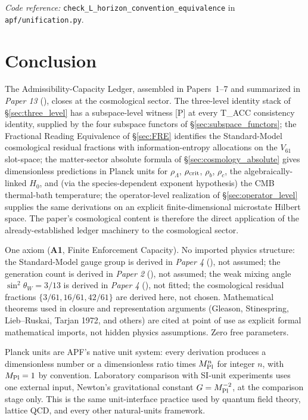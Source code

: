 \documentclass[11pt]{article}
\newcommand{\coderef}[2]{\smallskip\noindent\textit{Code reference:} \texttt{#1} in \texttt{#2}.}
\newcommand{\paperref}[2]{\emph{Paper #1} (\emph{#2})}
\newcommand{\Aone}{\textbf{A1}}
\newcommand{\Mpl}{M_{\rm Pl}}
\begin{document}
\coderef{check\_L\_horizon\_convention\_equivalence}{apf/unification.py}

\section{Conclusion}\label{sec:conclusion}

The Admissibility-Capacity Ledger, assembled in Papers~1--7 and summarized in \paperref{13}{}, closes at the cosmological sector. The three-level identity stack of \S\ref{sec:three_level} has a subspace-level witness [P] at every T\_ACC consistency identity, supplied by the four subspace functors of \S\ref{sec:subspace_functors}; the Fractional Reading Equivalence of \S\ref{sec:FRE} identifies the Standard-Model cosmological residual fractions with information-entropy allocations on the $V_{61}$ slot-space; the matter-sector absolute formula of \S\ref{sec:cosmology_absolute} gives dimensionless predictions in Planck units for $\rho_\Lambda$, $\rho_{\rm crit}$, $\rho_b$, $\rho_c$, the algebraically-linked $H_0$, and (via the species-dependent exponent hypothesis) the CMB thermal-bath temperature; the operator-level realization of \S\ref{sec:operator_level} supplies the same derivations on an explicit finite-dimensional microstate Hilbert space. The paper's cosmological content is therefore the direct application of the already-established ledger machinery to the cosmological sector.

One axiom (\Aone{}, Finite Enforcement Capacity). No imported physics structure: the Standard-Model gauge group is derived in \paperref{4}{}, not assumed; the generation count is derived in \paperref{2}{}, not assumed; the weak mixing angle $\sin^2\theta_W = 3/13$ is derived in \paperref{4}{}, not fitted; the cosmological residual fractions $\{3/61, 16/61, 42/61\}$ are derived here, not chosen. Mathematical theorems used in closure and representation arguments (Gleason, Stinespring, Lieb--Ruskai, Tarjan 1972, and others) are cited at point of use as explicit formal mathematical imports, not hidden physics assumptions. Zero free parameters.

Planck units are APF's native unit system: every derivation produces a dimensionless number or a dimensionless ratio times $\Mpl^n$ for integer $n$, with $\Mpl = 1$ by convention. Laboratory comparison with SI-unit experiments uses one external input, Newton's gravitational constant $G = \Mpl^{-2}$, at the comparison stage only. This is the same unit-interface practice used by quantum field theory, lattice QCD, and every other natural-units framework.
\end{document}
